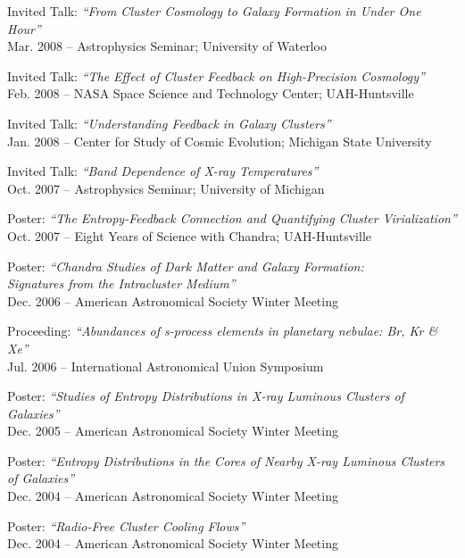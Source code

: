 \documentclass[12pt]{cv}
\begin{document}
\begin{llist}
{\sc Invited Talk: {\textit{``From Cluster Cosmology to Galaxy Formation in Under One Hour''}}}\\
Mar. 2008 -- Astrophysics Seminar; University of Waterloo

{\sc Invited Talk: {\textit{``The Effect of Cluster Feedback on High-Precision Cosmology''}}}\\
Feb. 2008 -- NASA Space Science and Technology Center; UAH-Huntsville

{\sc Invited Talk: {\textit{``Understanding Feedback in Galaxy Clusters''}}}\\
Jan. 2008 -- Center for Study of Cosmic Evolution; Michigan State University

{\sc Invited Talk: {\textit{``Band Dependence of X-ray Temperatures''}}}\\
Oct. 2007 -- Astrophysics Seminar; University of Michigan

{\sc Poster: {\textit{``The Entropy-Feedback Connection and Quantifying Cluster Virialization''}}}\\
Oct. 2007 -- Eight Years of Science with Chandra; UAH-Huntsville

{\sc Poster: {\textit{``Chandra Studies of Dark Matter and Galaxy Formation:\\ Signatures from the Intracluster Medium''}}}\\
Dec. 2006 -- American Astronomical Society Winter Meeting

{\sc Proceeding: {\textit{``Abundances of s-process elements in planetary nebulae: Br, Kr \& Xe''}}}\\
Jul. 2006 -- International Astronomical Union Symposium

{\sc Poster: {\textit{``Studies of Entropy Distributions in X-ray Luminous Clusters of Galaxies''}}}\\
Dec. 2005 -- American Astronomical Society Winter Meeting

{\sc Poster: {\textit{``Entropy Distributions in the Cores of Nearby X-ray Luminous Clusters of Galaxies''}}}\\
Dec. 2004 -- American Astronomical Society Winter Meeting

{\sc Poster: {\textit{``Radio-Free Cluster Cooling Flows''}}}\\
Dec. 2004 -- American Astronomical Society Winter Meeting



\end{llist}
\end{document}
